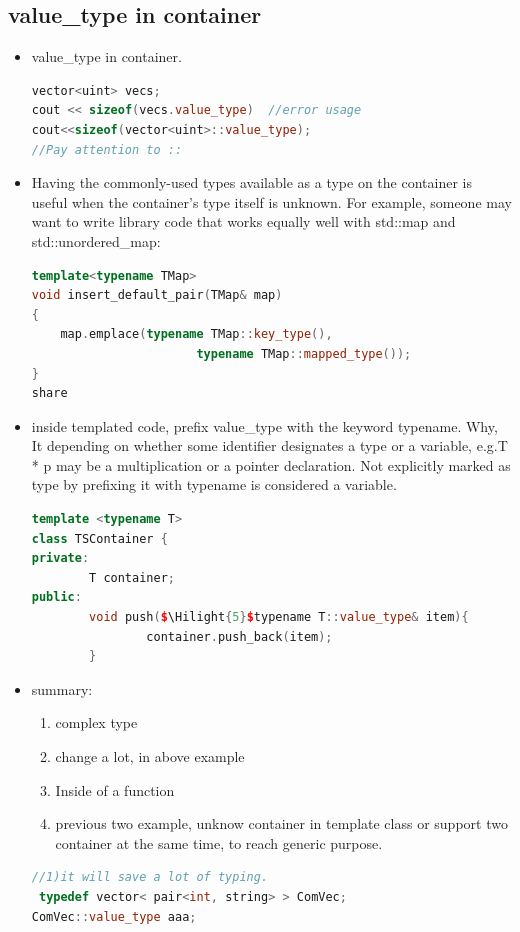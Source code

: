 \documentclass[a4paper,12pt,twoside]{book}
\newcommand{\Hilight}[1]{\makebox[0pt][l]{\color{yellow}\rule[-3pt]{#1em}{11pt}}}
\begin{document}
\subsection{value\_type in container}
\begin{itemize}
\item value\_type in container.
\begin{lstlisting}[frame=single, language=c++]
vector<uint> vecs;
cout << sizeof(vecs.value_type)  //error usage
cout<<sizeof(vector<uint>::value_type);
//Pay attention to ::
\end{lstlisting}

\item Having the commonly-used types available as a type on the container is useful when the container's type itself is unknown. For example, someone may want to write library code that works equally well with std::map and std::unordered\_map:
\begin{lstlisting}[frame=single, language=c++]
template<typename TMap>
void insert_default_pair(TMap& map)
{
    map.emplace(typename TMap::key_type(),
                       typename TMap::mapped_type());
}
share
\end{lstlisting}

\item inside templated code, prefix value\_type with the keyword typename. Why, It depending on whether some identifier designates a type or a variable, e.g.T * p may be a multiplication or a pointer declaration. Not explicitly marked as type by prefixing it with typename is considered a variable.

\begin{lstlisting}[frame=single, language=c++, mathescape=true]
template <typename T>
class TSContainer {
private:
        T container;
public:
        void push($\Hilight{5}$typename T::value_type& item){
                container.push_back(item);
        }
\end{lstlisting}


\item summary:
\begin{enumerate}
\item complex type
\item change a lot, in above example
\item Inside of a function
\item previous two example, unknow container in template class or support two container at the same time, to reach generic purpose.
\end{enumerate}
\begin{lstlisting}[frame=single, language=c++, mathescape=true]
//1)it will save a lot of typing.
 typedef vector< pair<int, string> > ComVec;
ComVec::value_type aaa;


\end{lstlisting}
\end{itemize}
\end{document}
